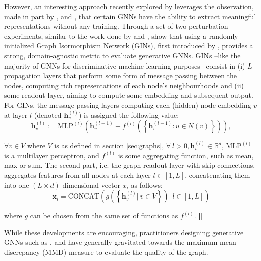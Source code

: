 However, an interesting approach recently explored by
\cite{thompson2022evaluation} leverages the observation, made in part by
\cite{xu2018powerful,morris2019weisfeiler}, and \cite{kipf2016semi}, that
certain GNNs have the ability to extract meaningful
representations without any training. Through a set of two perturbation
experiments, similar to the work done by \cite{xu2018empirical} and
\cite{o2021evaluation}, \cite{thompson2022evaluation} show that using a
randomly initialized Graph Isormorphism Network (GINs), first introduced by
\cite{xu2018powerful}, provides a strong, domain-agnostic metric to evaluate
generative GNNs. GINs --like the majority of GNNs for discriminative machine
learning purposes-- consist in (i) $L$ propagation layers that perform some form
of message passing between the nodes, computing rich representations of each
node's neighbourhoods and (ii) some readout layer, aiming to compute some
embedding and subsequent output. For GINs, the message passing layers computing
each (hidden) node embedding $v$ at layer $l$ (denoted $\mathbf{h}_{v}^{(l)}$)
is assigned the following value:
\begin{equation}
  \label{eq:mplgin}
  \mathbf{h}_{v}^{(l)}:=\text{MLP}^{(l)}\left(\mathbf{h}_{v}^{(l-1)} +
f^{(l)}\left(\left\{ \mathbf{h}_{v}^{(l-1)}: u\in N(v)\right\}\right)\right),
\end{equation}

$\forall v\in V$ where $V$ is as defined in section \ref{sec:graphs},
$\forall\ l>0, \mathbf{h}_{v}^{(l)}\in\mathbb{R}^d$, $\text{MLP}^{(l)}$ is a
multilayer perceptron, and $f^{(l)}$ is some aggregating function, such as mean,
max or sum. The second part, i.e. the graph readout layer with skip connections,
aggregates features from all nodes at each layer $l\in [1,L]$, concatenating
them into one $(L\times d)$ dimensional vector $x_i$ as follows:
\begin{equation}
  \label{eq:readout_gin}
  \mathbf{x}_i = \text{CONCAT}\left(  g\left( \left\{ \mathbf{h}_{v}^{(l)} |\ v\in V \right\} \right) |\ l \in [1, L] \right)
\end{equation}

where $g$ can be chosen from the same set of functions as $f^{(l)}$. \textbf{[]}

While these developments are encouraging, practitioners designing generative
GNNs such as \cite{liao2019efficient, niu2020permutation}, and
\cite{you2018graphrnn} have generally gravitated towards the maximum mean
discrepancy (MMD) measure to evaluate the quality of the graph.


